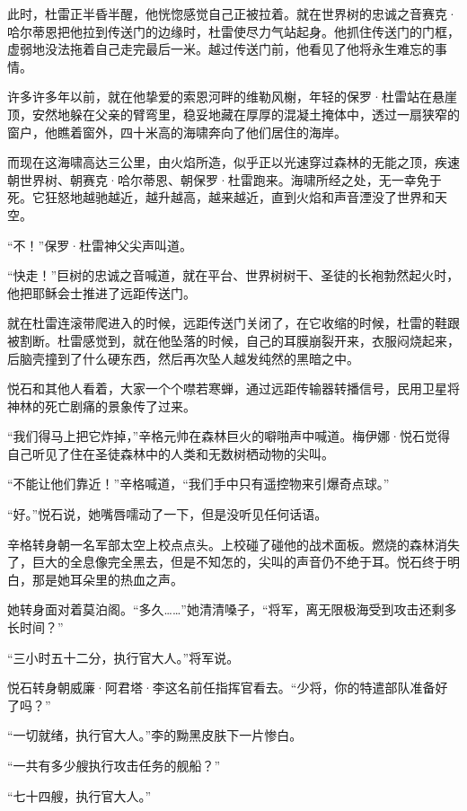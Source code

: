 \documentclass[AutoFakeBold=true]{book}
\begin{document}
此时，杜雷正半昏半醒，他恍惚感觉自己正被拉着。就在世界树的忠诚之音赛克·哈尔蒂恩把他拉到传送门的边缘时，杜雷使尽力气站起身。他抓住传送门的门框，虚弱地没法拖着自己走完最后一米。越过传送门前，他看见了他将永生难忘的事情。

许多许多年以前，就在他挚爱的索恩河畔的维勒风榭，年轻的保罗·杜雷站在悬崖顶，安然地躲在父亲的臂弯里，稳妥地藏在厚厚的混凝土掩体中，透过一扇狭窄的窗户，他瞧着窗外，四十米高的海啸奔向了他们居住的海岸。

而现在这海啸高达三公里，由火焰所造，似乎正以光速穿过森林的无能之顶，疾速朝世界树、朝赛克·哈尔蒂恩、朝保罗·杜雷跑来。海啸所经之处，无一幸免于死。它狂怒地越驰越近，越升越高，越来越近，直到火焰和声音湮没了世界和天空。

``不！''保罗·杜雷神父尖声叫道。

``快走！''巨树的忠诚之音喊道，就在平台、世界树树干、圣徒的长袍勃然起火时，他把耶稣会士推进了远距传送门。

就在杜雷连滚带爬进入的时候，远距传送门关闭了，在它收缩的时候，杜雷的鞋跟被割断。杜雷感觉到，就在他坠落的时候，自己的耳膜崩裂开来，衣服闷烧起来，后脑壳撞到了什么硬东西，然后再次坠人越发纯然的黑暗之中。

\vspace*{1em}

悦石和其他人看着，大家一个个噤若寒蝉，通过远距传输器转播信号，民用卫星将神林的死亡剧痛的景象传了过来。

``我们得马上把它炸掉，''辛格元帅在森林巨火的噼啪声中喊道。梅伊娜·悦石觉得自己听见了住在圣徒森林中的人类和无数树栖动物的尖叫。

``不能让他们靠近！''辛格喊道，``我们手中只有遥控物来引爆奇点球。''

``好。''悦石说，她嘴唇嚅动了一下，但是没听见任何话语。

辛格转身朝一名军部太空上校点点头。上校碰了碰他的战术面板。燃烧的森林消失了，巨大的全息像完全黑去，但是不知怎的，尖叫的声音仍不绝于耳。悦石终于明白，那是她耳朵里的热血之声。

她转身面对着莫泊阁。``多久……''她清清嗓子，``将军，离无限极海受到攻击还剩多长时间？''

``三小时五十二分，执行官大人。''将军说。

悦石转身朝威廉·阿君塔·李这名前任指挥官看去。``少将，你的特遣部队准备好了吗？''

``一切就绪，执行官大人。''李的黝黑皮肤下一片惨白。

``一共有多少艘执行攻击任务的舰船？''

``七十四艘，执行官大人。''
\end{document}
